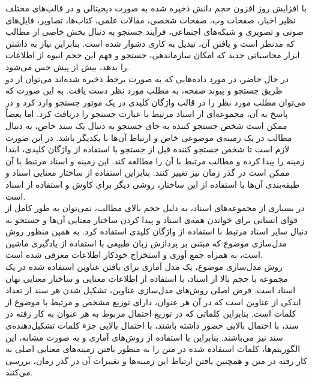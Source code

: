 
با افزایش روز افزون حجم دانش ذخیره شده به صورت دیجیتالی و در قالب‌های مختلف نظیر اخبار، صفحات وب، صفحات شخصی، مقالات علمی، کتاب‌ها، تصاویر، فایل‌های صوتی و تصویری و شبکه‌های اجتماعی، فرآیند جستجو به دنبال بخش خاصی از مطالب که مدنظر است و یافتن آن، تبدیل به کاری دشوار شده است. بنابراین نیاز به داشتن ابزار محاسباتی جدید که امکان سازماندهی، جستجو و فهم این حجم انبوه از اطلاعات را بدهد، بیش از پیش حس می‌شود.
\\
در حال حاضر، در مورد داده‌هایی که به صورت برخط ذخیره شده‌اند می‌توان از دو طریق جستجو و پیوند صفحه، به مطلب مورد نظر دست یافت. به این صورت که می‌توان مطلب مورد نظر را در قالب واژگان کلیدی در یک موتور جستجو وارد کرد و در پاسخ به آن، مجموعه‌ای از اسناد مرتبط با عبارت جستجو را دریافت کرد. اما بعضاً ممکن است شخص جستجو کننده به جای جستجو به دنبال یک سند خاص، به دنبال مطالب در یک زمینه‌ی موضوعی خاص و ارتباط آن‌ها با یکدیگر باشد. در این صورت لازم است تا شخص جستجو کننده قبل از جستجو با استفاده از واژگان کلیدی، ابتدا زمینه را پیدا کرده و مطالب مرتبط با آن را مطالعه کند. این زمینه و اسناد مرتبط با آن ممکن است در گذر زمان نیز تغییر کنند. بنابراین استفاده از ساختار معنایی اسناد و طبقه‌بندی آن‌ها با استفاده از این ساختار، روشی دیگر برای کاوش و استفاده از اسناد است.
\\
در بسیاری از مجموعه‌های اسناد، به دلیل حجم بالای مطالب، نمی‌توان به طور کامل از قوای انسانی برای خواندن همه‌ی اسناد و پیدا کردن ساختار معنایی آن‌ها و جستجو به دنبال سایر اسناد مرتبط با استفاده از واژگان کلیدی استفاده کرد. به همین منظور روش مدل‌سازی موضوع که مبتنی بر پردازش زبان طبیعی با استفاده از یادگیری ماشین است، به همراه جمع آوری و استخراج خودکار اطلاعات معرفی شده است.
\\
روش مدل‌سازی موضوع، یک مدل آماری برای یافتن عناوین استفاده شده در یک مجموعه با حجم بالا از اسناد، با استفاده از اطلاعات معنایی و ساختار معنایی نهان اسناد است. فرض اصلی روش‌های مدل‌سازی عناوین، تشکیل شدن هر سند از تعداد اندکی از عناوین است که در آن هر عنوان، دارای توزیع مشخص و مرتبط با موضوع از کلمات است. بنابراین کلماتی که در توزیع احتمال مربوط به هر عنوان به کار رفته در سند، با احتمال بالایی حضور داشته باشند، با احتمال بالایی جزء کلمات تشکیل‌دهنده‌ی سند نیز می‌باشند. بنابراین با استفاده از روش‌های آماری و به صورت مشابه، این الگوریتم‌ها، کلمات استفاده شده در متن را به منظور یافتن زمینه‌های معنایی اصلی به کار رفته در متن و همچنین یافتن ارتباط این زمینه‌ها و تغییرات آن در گذر زمان، بررسی می‌کنند.